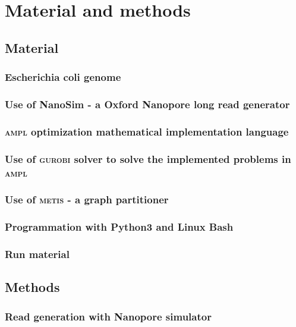 \chapter{Material and methods}

\section{Material}

\subsection{Escherichia coli genome}

\subsection{Use of NanoSim - a Oxford Nanopore long read generator}

\subsection{\textsc{ampl} optimization mathematical implementation language}

\subsection{Use of \textsc{gurobi} solver to solve the implemented problems in \textsc{ampl}}

\subsection{Use of \textsc{metis} - a graph partitioner}

\subsection{Programmation with Python3 and Linux Bash}

\subsection{Run material}

\section{Methods}

\subsection{Read generation with Nanopore simulator}

\newpage